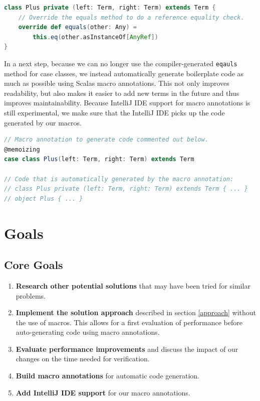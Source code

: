 \documentclass[11pt]{article}
\begin{document}
    \begin{lstlisting}[language=Scala, caption=We override the the default equals method to do a simple reference equality check.]
class Plus private (left: Term, right: Term) extends Term {
    // Override the equals method to do a reference equality check.
    override def equals(other: Any) =
        this.eq(other.asInstanceOf[AnyRef])
}
    \end{lstlisting}

    In a next step, because we can no longer use the compiler-generated \texttt{eqauls} method for case classes,
    we instead automatically generate boilerplate code as much as possible
    using Scalas macro annotations. This not only improves readability, but also makes
    it easier to add new terms in the future and thus improves maintainability.
    Because IntelliJ IDE support for macro annotations is still experimental,
    we make sure that the IntelliJ IDE picks up the code generated by our macros.

    \begin{lstlisting}[language=Scala, caption=One possible way to use macro annotations to automatically generate code.]
// Macro annotation to generate code commented out below.
@memoizing
case class Plus(left: Term, right: Term) extends Term

// Code that is automatically generated by the macro annotation:
// class Plus private (left: Term, right: Term) extends Term { ... }
// object Plus { ... }
        \end{lstlisting}

    \section{Goals}
    \subsection{Core Goals}
    \begin{enumerate}
        \item \textbf{Research other potential solutions} that may have been
        tried for similar problems.
        \item \textbf{Implement the solution approach} described in section
        \ref{approach} without the use of macros. This allows for a first
        evaluation of performance before auto-generating code using macro
        annotations.
        \item \textbf{Evaluate performance improvements} and discuss
        the impact of our changes on the time needed for verification.
        \item \textbf{Build macro annotations} for automatic code generation.
        \item \textbf{Add IntelliJ IDE support} for our macro annotations.
    \end{enumerate}
\end{document}
